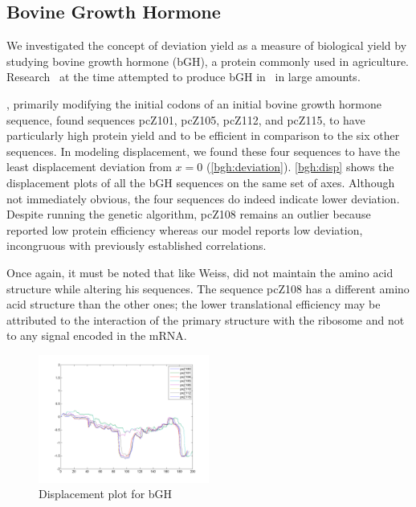 \documentclass[12pt]{article}
\numberwithin{equation}{section}
\begin{document}
\subsection{Bovine Growth Hormone}
\label{section:bgh}

We investigated the concept of deviation yield as a measure of biological
yield by studying bovine growth hormone (bGH), a protein commonly used
in agriculture.
Research~\cite{schoner:bgh} at the time attempted to produce bGH
in \ecoli\ in large amounts.



\citet{schoner:bgh}, primarily modifying the initial codons of an
initial bovine growth hormone sequence, found sequences pcZ101,
pcZ105, pcZ112, and pcZ115, to have particularly high protein yield
and to be efficient in comparison to the six other sequences. In
modeling displacement, we found these four sequences  to have the least
displacement deviation from $x = 0$
(\autoref{bgh:deviation}). \autoref{bgh:disp} shows the displacement
plots of all the bGH sequences on the same set of axes. Although not
immediately obvious, the four sequences do indeed indicate lower
deviation. Despite running the genetic algorithm, pcZ108 remains an
outlier because \citeauthor{schoner:bgh} reported low protein
efficiency whereas our model reports low deviation, incongruous with
previously established correlations.

Once again, it must be noted that like Weiss, \citeauthor{schoner:bgh}
did not maintain the amino acid structure while altering his sequences.
The sequence pcZ108 has a different amino acid structure than the other
ones; the lower translational efficiency may be attributed to the interaction
of the primary structure with the ribosome and not to any signal encoded
in the mRNA.

\begin{figure}
  \caption{Displacement plot for bGH}
  \label{bgh:disp}
  \includegraphics[width=0.5\textwidth]{bgh/all}
\end{figure}
\end{document}
